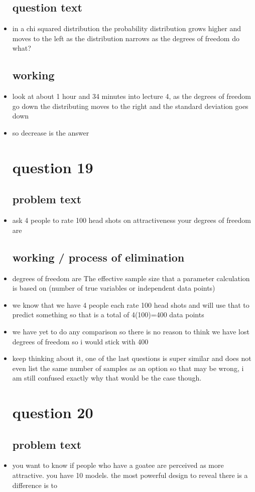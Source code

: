 \documentclass{article}
\begin{document}
\begin{itemize}
\subsection{question text}
\item in a chi squared distribution the probability distribution grows higher and moves to the left as the distribution narrows as the degrees of freedom do what?
\subsection{working}
\item look at about 1 hour and 34 minutes into lecture 4, as the degrees of freedom go down the distributing moves to the right and the standard deviation goes down 
\item so decrease is the answer
\section{question 19}
\subsection{problem text}
\item ask 4 people to rate 100 head shots on attractiveness your degrees of freedom are
\subsection{working / process of elimination }
\item degrees of freedom are The effective sample size that
a parameter calculation is based on (number of true
variables or independent data points)
\item we know that we have 4 people each rate 100 head shots and will use that to predict something so that is a total of 4(100)=400 data points
\item we have yet to do any comparison so there is no reason to think we have lost degrees of freedom so i would stick with 400
\item keep thinking about it, one of the last questions is super similar and does not even list the same number of samples as an option so that may be wrong, i am still confused exactly why that would be the case though.

\section{question 20}
\subsection{problem text}
\item you want to know if people who have a goatee are perceived as more attractive. you have 10 models. the most powerful design to reveal there is a difference is to


\end{itemize}
\end{document}
